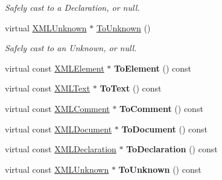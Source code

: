 \begin{DoxyCompactItemize}
\begin{DoxyCompactList}\small\item\em Safely cast to a Declaration, or null. \end{DoxyCompactList}\item 
\mbox{\label{classtinyxml2_1_1XMLNode_a8675a74aa0ada6eccab0c77ef3e5b9bd}} 
virtual \hyperlink{classtinyxml2_1_1XMLUnknown}{X\+M\+L\+Unknown} $\ast$ \hyperlink{classtinyxml2_1_1XMLNode_a8675a74aa0ada6eccab0c77ef3e5b9bd}{To\+Unknown} ()
\begin{DoxyCompactList}\small\item\em Safely cast to an Unknown, or null. \end{DoxyCompactList}\item 
\mbox{\label{classtinyxml2_1_1XMLNode_a2c5c843b8f37306f15994ebe882b9346}} 
virtual const \hyperlink{classtinyxml2_1_1XMLElement}{X\+M\+L\+Element} $\ast$ {\bfseries To\+Element} () const
\item 
\mbox{\label{classtinyxml2_1_1XMLNode_acb9ccc1beda27c0efcb0545683c3e7f4}} 
virtual const \hyperlink{classtinyxml2_1_1XMLText}{X\+M\+L\+Text} $\ast$ {\bfseries To\+Text} () const
\item 
\mbox{\label{classtinyxml2_1_1XMLNode_a6a53bb83faf5c0ccc95b6cf74dba0025}} 
virtual const \hyperlink{classtinyxml2_1_1XMLComment}{X\+M\+L\+Comment} $\ast$ {\bfseries To\+Comment} () const
\item 
\mbox{\label{classtinyxml2_1_1XMLNode_ae8a5250331a5f12e10843fcb5ef3ef0b}} 
virtual const \hyperlink{classtinyxml2_1_1XMLDocument}{X\+M\+L\+Document} $\ast$ {\bfseries To\+Document} () const
\item 
\mbox{\label{classtinyxml2_1_1XMLNode_ac48bb4bf9eb7bb3654ad4b94945db9a1}} 
virtual const \hyperlink{classtinyxml2_1_1XMLDeclaration}{X\+M\+L\+Declaration} $\ast$ {\bfseries To\+Declaration} () const
\item 
\mbox{\label{classtinyxml2_1_1XMLNode_af29ffd6cbe609b6fa04a705256150408}} 
virtual const \hyperlink{classtinyxml2_1_1XMLUnknown}{X\+M\+L\+Unknown} $\ast$ {\bfseries To\+Unknown} () const

\end{DoxyCompactItemize}
